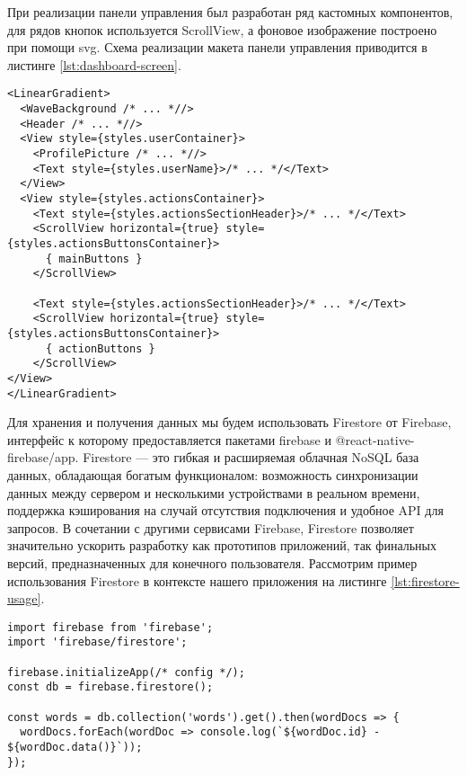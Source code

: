 При реализации панели управления был разработан ряд кастомных компонентов, для рядов кнопок используется ScrollView, а фоновое изображение построено при помощи svg. Схема реализации макета панели управления приводится в листинге \ref{lst:dashboard-screen}.
\begin{lstlisting}[basicstyle=\fontsize{11}{11}\selectfont,tabsize=4,breaklines=true,caption={Структура страницы панели управления.},captionpos=b,label={lst:dashboard-screen}]
<LinearGradient>
  <WaveBackground /* ... *//>
  <Header /* ... *//>
  <View style={styles.userContainer}>
    <ProfilePicture /* ... *//>
    <Text style={styles.userName}>/* ... */</Text>
  </View>
  <View style={styles.actionsContainer}>
    <Text style={styles.actionsSectionHeader}>/* ... */</Text>
    <ScrollView horizontal={true} style={styles.actionsButtonsContainer}>
      { mainButtons }
    </ScrollView>

    <Text style={styles.actionsSectionHeader}>/* ... */</Text>
    <ScrollView horizontal={true} style={styles.actionsButtonsContainer}>
      { actionButtons }
    </ScrollView>
</View>
</LinearGradient>
\end{lstlisting}

Для хранения и получения данных мы будем использовать Firestore от Firebase, интерфейс к которому предоставляется пакетами firebase и @react-native-firebase/app. Firestore --- это гибкая и расширяемая облачная NoSQL база данных, обладающая богатым функционалом: возможность синхронизации данных между сервером и несколькими устройствами в реальном времени, поддержка кэширования на случай отсутствия подключения и удобное API для запросов. В сочетании с другими сервисами Firebase, Firestore позволяет значительно ускорить разработку как прототипов приложений, так финальных версий, предназначенных для конечного пользователя. Рассмотрим пример использования Firestore в контексте нашего приложения на листинге \ref{lst:firestore-usage}.

\begin{lstlisting}[basicstyle=\fontsize{11}{11}\selectfont,tabsize=4,breaklines=true,caption={Использования Firestore для получения данных карточек главной ленты.},captionpos=b,label={lst:firestore-usage}]
import firebase from 'firebase';
import 'firebase/firestore';

firebase.initializeApp(/* config */);
const db = firebase.firestore();

const words = db.collection('words').get().then(wordDocs => {
  wordDocs.forEach(wordDoc => console.log(`${wordDoc.id} - ${wordDoc.data()}`));
});

\end{lstlisting}


